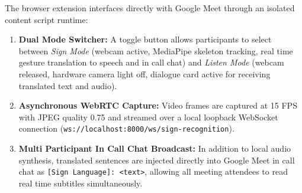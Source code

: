 \documentclass[10pt,conference]{IEEEtran}
\begin{document}
The browser extension interfaces directly with Google Meet through an isolated content script runtime:
\begin{enumerate}
    \item \textbf{Dual Mode Switcher:} A toggle button allows participants to select between \textit{Sign Mode} (webcam active, MediaPipe skeleton tracking, real time gesture translation to speech and in call chat) and \textit{Listen Mode} (webcam released, hardware camera light off, dialogue card active for receiving translated text and audio).
    \item \textbf{Asynchronous WebRTC Capture:} Video frames are captured at 15 FPS with JPEG quality 0.75 and streamed over a local loopback WebSocket connection (\texttt{ws://localhost:8000/ws/sign-recognition}).
    \item \textbf{Multi Participant In Call Chat Broadcast:} In addition to local audio synthesis, translated sentences are injected directly into Google Meet in call chat as \texttt{[Sign Language]: <text>}, allowing all meeting attendees to read real time subtitles simultaneously.
\end{enumerate}
\end{document}
